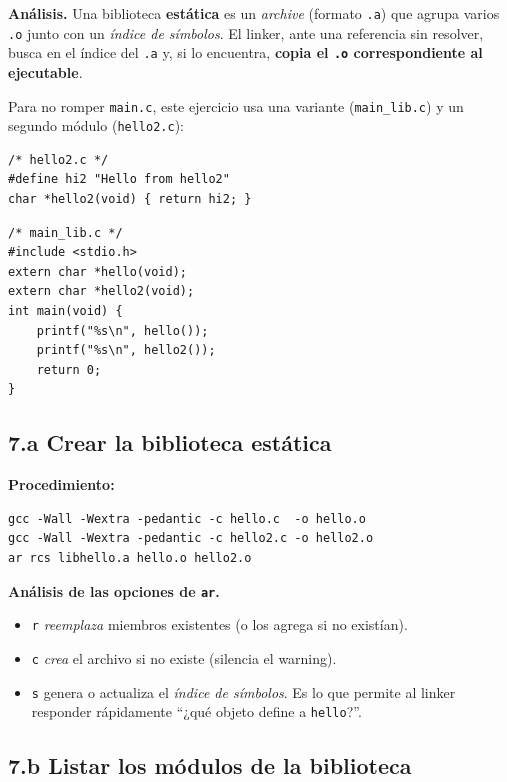 \documentclass[11pt,a4paper]{article}
\begin{document}
\textbf{Análisis.} Una biblioteca \textbf{estática} es un \emph{archive}
(formato \texttt{.a}) que agrupa varios \texttt{.o} junto con un
\emph{índice de símbolos}. El linker, ante una referencia sin
resolver, busca en el índice del \texttt{.a} y, si lo encuentra,
\textbf{copia el \texttt{.o} correspondiente al ejecutable}.

Para no romper \texttt{main.c}, este ejercicio usa una variante
(\texttt{main\_lib.c}) y un segundo módulo (\texttt{hello2.c}):

\begin{lstlisting}[style=cstyle]
/* hello2.c */
#define hi2 "Hello from hello2"
char *hello2(void) { return hi2; }
\end{lstlisting}

\begin{lstlisting}[style=cstyle]
/* main_lib.c */
#include <stdio.h>
extern char *hello(void);
extern char *hello2(void);
int main(void) {
    printf("%s\n", hello());
    printf("%s\n", hello2());
    return 0;
}
\end{lstlisting}

\subsection*{7.a Crear la biblioteca estática}

\textbf{Procedimiento:}

\begin{lstlisting}
gcc -Wall -Wextra -pedantic -c hello.c  -o hello.o
gcc -Wall -Wextra -pedantic -c hello2.c -o hello2.o
ar rcs libhello.a hello.o hello2.o
\end{lstlisting}

\textbf{Análisis de las opciones de \texttt{ar}.}
\begin{itemize}[leftmargin=*, itemsep=0pt]
    \item \texttt{r} \emph{reemplaza} miembros existentes (o los
        agrega si no existían).
    \item \texttt{c} \emph{crea} el archivo si no existe (silencia el
        warning).
    \item \texttt{s} genera o actualiza el \emph{índice de símbolos}.
        Es lo que permite al linker responder rápidamente ``¿qué
        objeto define a \texttt{hello}?''.
\end{itemize}

\subsection*{7.b Listar los módulos de la biblioteca}
\end{document}
